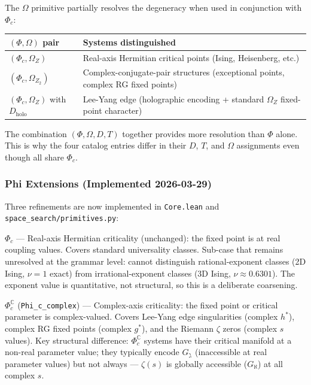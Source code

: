 \documentclass[12pt,a4paper]{article}
\begin{document}
The $\Omega$ primitive partially resolves the degeneracy when used in conjunction with $\Phi_c$:

\begin{table}[htbp]
\centering
\small
{}
\begin{tabularx}{\textwidth}{>{\centering\arraybackslash}X >{\centering\arraybackslash}X}
\toprule
\rowcolor{gray!25}\textbf{$(\Phi, \Omega)$ pair} & \textbf{Systems distinguished} \\
\midrule
\rowcolors{1}{white}{gray!10}
$(\Phi_c, \Omega_Z)$ & Real-axis Hermitian critical points (Ising, Heisenberg, etc.) \\
$(\Phi_c, \Omega_{Z_2})$ & Complex-conjugate-pair structures (exceptional points, complex RG fixed points) \\
$(\Phi_c, \Omega_Z)$ with $D_\text{holo}$ & Lee-Yang edge (holographic encoding + standard $\Omega_Z$ fixed-point character) \\
\bottomrule
\end{tabularx}
\end{table}

The combination $(\Phi, \Omega, D, T)$ together provides more resolution than $\Phi$ alone. This is why the four catalog entries differ in their $D$, $T$, and $\Omega$ assignments even though all share $\Phi_c$.

\subsubsection{Phi Extensions (Implemented 2026-03-29)}

Three refinements are now implemented in \texttt{Core.lean} and \texttt{space\_search/primitives.py}:

\textbf{$\Phi_c$} --- Real-axis Hermitian criticality (unchanged): the fixed point is at real coupling values. Covers standard universality classes. Sub-case that remains unresolved at the grammar level: cannot distinguish rational-exponent classes (2D Ising, $\nu=1$ exact) from irrational-exponent classes (3D Ising, $\nu \approx 0.6301$). The exponent value is quantitative, not structural, so this is a deliberate coarsening.

\textbf{$\Phi_c^\mathbb{C}$} (\texttt{Phi\_c\_complex}) --- Complex-axis criticality: the fixed point or critical parameter is complex-valued. Covers Lee-Yang edge singularities (complex $h^*$), complex RG fixed points (complex $g^*$), and the Riemann $\zeta$ zeros (complex $s$ values). Key structural difference: $\Phi_c^\mathbb{C}$ systems have their critical manifold at a non-real parameter value; they typically encode $G_{\gimel}$ (inaccessible at real parameter values) but not always --- $\zeta(s)$ is globally accessible ($G_{\aleph}$) at all complex $s$.
\end{document}
